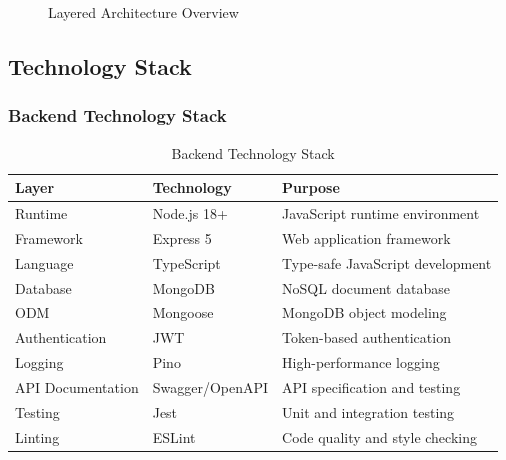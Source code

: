 \begin{figure}[H]
\caption{Layered Architecture Overview}
\label{fig:layered-arch}
\end{figure}

\subsection{Technology Stack}

\subsubsection{Backend Technology Stack}
\begin{table}[H]
\centering
\small
\renewcommand{\arraystretch}{1.3}
\begin{tabularx}{\textwidth}{|l|l|>{\RaggedRight\arraybackslash}X|}
\hline
\textbf{Layer} & \textbf{Technology} & \textbf{Purpose} \\
\hline
Runtime & Node.js 18+ & JavaScript runtime environment \\
\hline
Framework & Express 5 & Web application framework \\
\hline
Language & TypeScript & Type-safe JavaScript development \\
\hline
Database & MongoDB & NoSQL document database \\
\hline
ODM & Mongoose & MongoDB object modeling \\
\hline
Authentication & JWT & Token-based authentication \\
\hline
Logging & Pino & High-performance logging \\
\hline
API Documentation & Swagger/OpenAPI & API specification and testing \\
\hline
Testing & Jest & Unit and integration testing \\
\hline
Linting & ESLint & Code quality and style checking \\
\hline
\end{tabularx}
\caption{Backend Technology Stack}
\label{tab:backend-stack}
\end{table}


